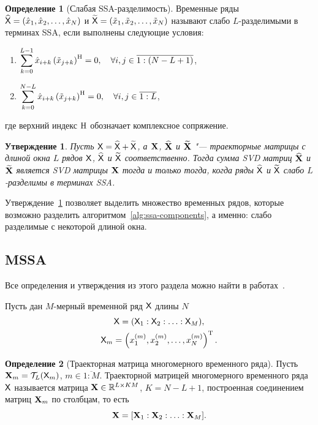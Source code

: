 \documentclass[specialist,
  substylefile = spbu.rtx,
subf,href,colorlinks=true, 12pt]{disser}
\theoremstyle{plain}
\newtheorem{statement}{Утверждение}[section]
\theoremstyle{definition}
\newtheorem{definition}{Определение}[section]
\theoremstyle{remark}
\begin{document}
\begin{definition}[Слабая SSA-разделимость]
  \label{def:ssa-separability}
  Временные ряды $\widehat{\mathsf{X}} = (\hat{x}_1, \hat{x}_2, \ldots, \hat{x}_N)$ и
  $\widetilde{\mathsf{X}} = (\tilde{x}_1, \tilde{x}_2, \ldots, \tilde{x}_N)$
  называют слабо $L$-разделимыми в терминах
  SSA, если выполнены следующие условия:
  \begin{enumerate}
    \item $\displaystyle \sum_{k=0}^{L - 1} \hat{x}_{i +
      k}\left(\tilde{x}_{j + k}\right)^{\mathrm{H}} = 0,
      \quad \forall i, j \in \overline{1:(N - L + 1)}$,
    \item $\displaystyle \sum_{k=0}^{N - L}\hat{x}_{i +
      k}\left(\tilde{x}_{j + k}\right)^{\mathrm{H}} = 0,
      \quad \forall i, j \in \overline{1:L}$,
  \end{enumerate}
  где верхний индекс $\mathrm{H}$ обозначает комплексное сопряжение.
\end{definition}

\begin{statement}
  \label{state:ssa-separability}
  Пусть $\mathsf{X} = \widehat{\mathsf{X}} + \widetilde{\mathsf{X}}$, а $\mathbf{X}$,
  $\widehat{\mathbf{X}}$ и $\widetilde{\mathbf{X}}$ "--- траекторные
  матрицы с длиной окна $L$ рядов $\mathsf{X}$, $\widehat{\mathsf{X}}$ и
  $\widetilde{\mathsf{X}}$ соответственно.
  Тогда сумма \emph{SVD} матриц $\widehat{\mathbf{X}}$ и $\widetilde{\mathbf{X}}$
  является \emph{SVD} матрицы $\mathbf{X}$ тогда и только тогда, когда
  ряды $\widehat{\mathsf{X}}$ и $\widetilde{\mathsf{X}}$ слабо $L$-разделимы в
  терминах \emph{SSA}.
\end{statement}

Утверждение~\ref{state:ssa-separability} позволяет выделить множество
временных рядов, которые возможно
разделить алгоритмом~\ref{alg:ssa-components}, а именно: слабо
разделимые с некоторой длиной окна.

\subsection{MSSA}\label{subsec:mssa}
Все определения и утверждения из этого раздела можно найти в
работах~\cite{mssa, mssa2, ssa-2020}.

Пусть дан $M$-мерный временной ряд $\mathsf{X}$ длины $N$
\begin{gather*}
  \mathsf{X} = (\mathsf{X}_1: \mathsf{X}_2: \ldots: \mathsf{X}_M), \\
  \mathsf{X}_m = \left(x_1^{(m)}, x_2^{(m)}, \ldots, x_N^{(m)}\right)^{\mathrm{T}}.
\end{gather*}

\begin{definition}[Траекторная матрица многомерного временного ряда]
  Пусть \linebreak $\mathbf{X}_m = \mathcal{T}_L(\mathsf{X}_m)$, $m \in \overline{1:M}$.
  Траекторной матрицей многомерного временного ряда $\mathsf{X}$ называется
  матрица $\mathbf{X}\in \mathbb{R}^{L \times KM}$, $K = N - L + 1$, построенная
  соединением матриц $\mathbf{X}_m$ по столбцам, то есть
  \[
    \mathbf{X} = [\mathbf{X}_1 : \mathbf{X}_2 : \ldots : \mathbf{X}_M].
  \]
\end{definition}
\end{document}

